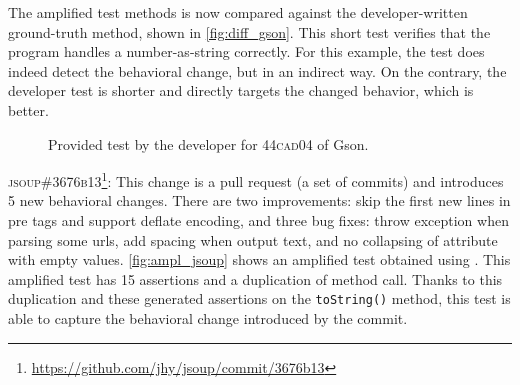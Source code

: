 The amplified test methods is now compared against the developer-written ground-truth method, shown in \autoref{fig:diff_gson}. 
This short test verifies that the program handles a number-as-string correctly.
For this example, the \DCI test does indeed detect the behavioral change, but in an indirect way.
On the contrary, the developer test is shorter and directly targets the changed behavior, which is better.

\begin{figure}[h]
\centering
{}
\caption{Provided test by the developer for \textsc{44cad04} of Gson.}
\label{fig:diff_gson}
\end{figure}

\textsc{jsoup\#3676b13}\footnote{\url{https://github.com/jhy/jsoup/commit/3676b13}}: This change is a pull request (\ie a set of commits) and introduces 5 new behavioral changes.
There are two improvements: skip the first new lines in pre tags and support deflate encoding, and three bug fixes: throw exception when parsing some urls, add spacing when output text, and no collapsing of attribute with empty values.
\autoref{fig:ampl_jsoup} shows an amplified test obtained using \DCII.
This amplified test has 15 assertions and a duplication of method call.
Thanks to this duplication and these generated assertions on the \texttt{toString()} method, this test is able to capture the behavioral change introduced by the commit.

